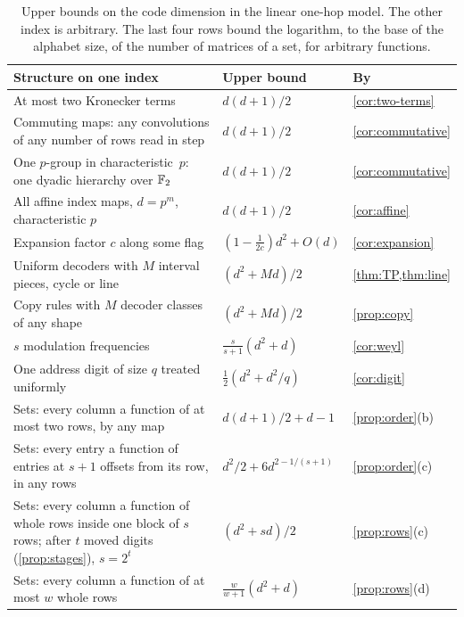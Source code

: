 \begin{table}[ht]
\centering\small
\begin{tabular}{@{}>{\raggedright\arraybackslash}p{}>{\raggedright\arraybackslash}p{}l@{}}
\toprule
Structure on one index & Upper bound & By \\
\midrule
At most two Kronecker terms & $d(d+1)/2$ & \cref{cor:two-terms} \\
Commuting maps: any convolutions of any number of rows read in step & $d(d+1)/2$ & \cref{cor:commutative} \\
One $p$-group in characteristic~$p$: one dyadic hierarchy over $\mathbb{F}_2$ & $d(d+1)/2$ & \cref{cor:commutative} \\
All affine index maps, $d=p^m$, characteristic $p$ & $d(d+1)/2$ & \cref{cor:affine} \\
Expansion factor $c$ along some flag & $(1-\frac1{2c})d^2+O(d)$ & \cref{cor:expansion} \\
Uniform decoders with $M$ interval pieces, cycle or line & $(d^2+Md)/2$ & \cref{thm:TP,thm:line} \\
Copy rules with $M$ decoder classes of any shape & $(d^2+Md)/2$ & \cref{prop:copy} \\
$s$ modulation frequencies & $\frac s{s+1}(d^2+d)$ & \cref{cor:weyl} \\
One address digit of size $q$ treated uniformly & $\frac12(d^2+d^2/q)$ & \cref{cor:digit} \\
Sets: every column a function of at most two rows, by any map & $d(d+1)/2+d-1$ &
\cref{prop:order}(b) \\
Sets: every entry a function of entries at $s+1$ offsets from its row, in any rows & $d^2/2+6d^{2-1/(s+1)}$ &
\cref{prop:order}(c) \\
Sets: every column a function of whole rows inside one block of $s$ rows; after $t$ moved digits
(\cref{prop:stages}), $s=2^t$ & $(d^2+sd)/2$ & \cref{prop:rows}(c) \\
Sets: every column a function of at most $w$ whole rows & $\frac w{w+1}(d^2+d)$ & \cref{prop:rows}(d) \\
\bottomrule
\end{tabular}
\caption{Upper bounds on the code dimension in the linear one-hop model. The other index is arbitrary. The last four
rows bound the logarithm, to the base of the alphabet size, of the number of matrices of a set, for arbitrary
functions.}
\label{tab:fail}
\end{table}

